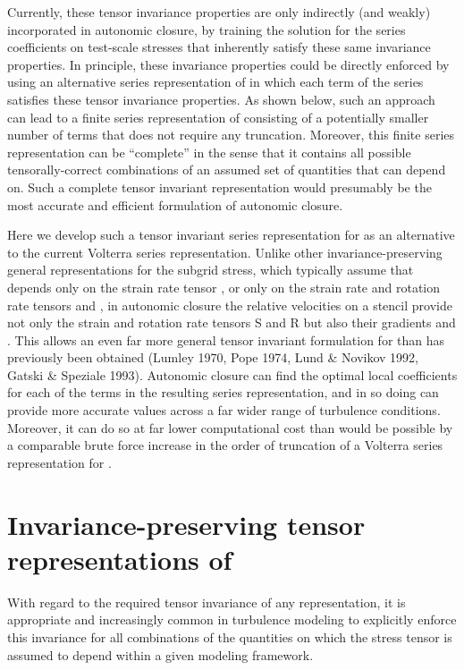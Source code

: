 Currently, these tensor invariance properties are only indirectly (and weakly) incorporated in autonomic closure, by training the solution for the series coefficients on test-scale stresses that inherently satisfy these same invariance properties. In principle, these invariance properties could be directly enforced by using an alternative series representation of   in which each term of the series satisfies these tensor invariance properties. As shown below, such an approach can lead to a finite series representation of   consisting of a potentially smaller number of terms that does not require any truncation. Moreover, this finite series representation can be “complete” in the sense that it contains all possible tensorally-correct combinations of an assumed set of quantities that   can depend on. Such a complete tensor invariant representation would presumably be the most accurate and efficient formulation of autonomic closure.

Here we develop such a tensor invariant series representation for   as an alternative to the current Volterra series representation. Unlike other invariance-preserving general representations for the subgrid stress, which typically assume that   depends only on the strain rate tensor  , or only on the strain rate and rotation rate tensors   and  , in autonomic closure the relative velocities on a   stencil provide not only the strain and rotation rate tensors S and R but also their gradients   and  . This allows an even far more general tensor invariant formulation for   than has previously been obtained (Lumley 1970, Pope 1974, Lund & Novikov 1992, Gatski & Speziale 1993). Autonomic closure can find the optimal local coefficients for each of the terms in the resulting series representation, and in so doing can provide more accurate   values across a far wider range of turbulence conditions.  Moreover, it can do so at far lower computational cost than would be possible by a comparable brute force increase in the order of truncation of a Volterra series representation for  .

\section{Invariance-preserving tensor representations of  } 

With regard to the required tensor invariance of any   representation, it is appropriate and increasingly common in turbulence modeling to explicitly enforce this invariance for all combinations of the quantities on which the stress tensor   is assumed to depend within a given modeling framework.  

